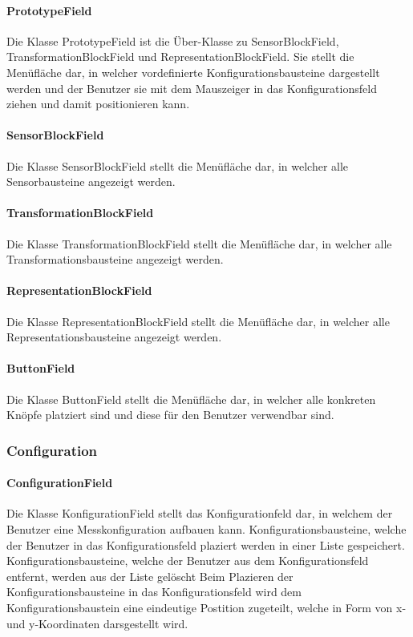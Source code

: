 \documentclass[parskip=full]{scrartcl}
\begin{document}
\paragraph{PrototypeField}
Die Klasse PrototypeField ist die Über-Klasse zu SensorBlockField, TransformationBlockField und RepresentationBlockField. 
Sie stellt die Menüfläche dar, in welcher vordefinierte Konfigurationsbausteine dargestellt werden und der Benutzer sie mit dem Mauszeiger in das Konfigurationsfeld ziehen und damit positionieren kann.

\paragraph{SensorBlockField}
Die Klasse SensorBlockField stellt die Menüfläche dar, in welcher alle Sensorbausteine angezeigt werden.

\paragraph{TransformationBlockField}
Die Klasse TransformationBlockField stellt die Menüfläche dar, in welcher alle Transformationsbausteine angezeigt werden.

\paragraph{RepresentationBlockField}
Die Klasse RepresentationBlockField stellt die Menüfläche dar, in welcher alle Representationsbausteine angezeigt werden.

\paragraph{ButtonField}
Die Klasse ButtonField stellt die Menüfläche dar, in welcher alle konkreten Knöpfe platziert sind und diese für den Benutzer verwendbar sind.

\newpage

\subsubsection{Configuration}

\paragraph{ConfigurationField}
Die Klasse KonfigurationField stellt das Konfigurationfeld dar, in welchem der Benutzer eine Messkonfiguration aufbauen kann.
Konfigurationsbausteine, welche der Benutzer in das Konfigurationsfeld plaziert werden in einer Liste gespeichert. 
Konfigurationsbausteine, welche der Benutzer aus dem Konfigurationsfeld entfernt, werden aus der Liste gelöscht
Beim Plazieren der Konfigurationsbausteine in das Konfigurationsfeld wird dem Konfigurationsbaustein eine eindeutige Postition zugeteilt, welche in Form von x- und y-Koordinaten darsgestellt wird.
\end{document}

